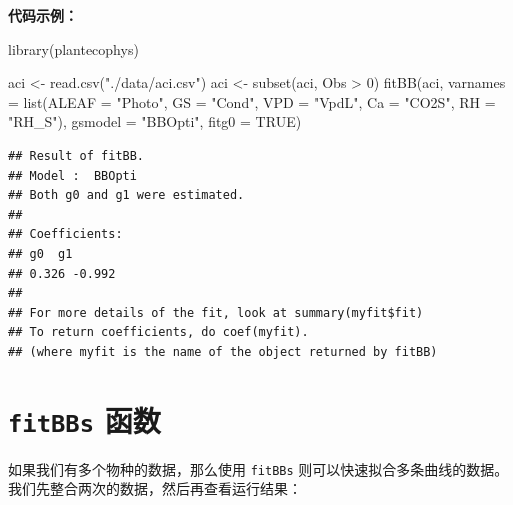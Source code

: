 \documentclass[
]{krantz}
\makeatletter
\newenvironment{Shaded}{\begin{snugshade}}{\end{snugshade}}
\newcommand{\AttributeTok}[1]{\textcolor[rgb]{0.77,0.63,0.00}{#1}}
\newcommand{\ConstantTok}[1]{\textcolor[rgb]{0.00,0.00,0.00}{#1}}
\newcommand{\DecValTok}[1]{\textcolor[rgb]{0.00,0.00,0.81}{#1}}
\newcommand{\FunctionTok}[1]{\textcolor[rgb]{0.00,0.00,0.00}{#1}}
\newcommand{\NormalTok}[1]{#1}
\newcommand{\OtherTok}[1]{\textcolor[rgb]{0.56,0.35,0.01}{#1}}
\newcommand{\SpecialCharTok}[1]{\textcolor[rgb]{0.00,0.00,0.00}{#1}}
\newcommand{\StringTok}[1]{\textcolor[rgb]{0.31,0.60,0.02}{#1}}
\newenvironment{kframe}{%
\medskip{}
\setlength{\fboxsep}{.8em}
 \def\at@end@of@kframe{}%
 \ifinner\ifhmode%
  \def\at@end@of@kframe{\end{minipage}}%
  \begin{minipage}{\columnwidth}%
 \fi\fi%
 \def\FrameCommand##1{\hskip\@totalleftmargin \hskip-\fboxsep
 \colorbox{shadecolor}{##1}\hskip-\fboxsep
     \hskip-\linewidth \hskip-\@totalleftmargin \hskip\columnwidth}%
 \MakeFramed {\advance\hsize-\width
   \@totalleftmargin\z@ \linewidth\hsize
   \@setminipage}}%
 {\par\unskip\endMakeFramed%
 \at@end@of@kframe}
\renewenvironment{Shaded}{\begin{kframe}}{\end{kframe}}
\makeatother
\begin{document}
\textbf{代码示例：}

\begin{Shaded}
\begin{Highlighting}[]
\FunctionTok{library}\NormalTok{(plantecophys)}

\NormalTok{aci }\OtherTok{\textless{}{-}} \FunctionTok{read.csv}\NormalTok{(}\StringTok{"./data/aci.csv"}\NormalTok{)}
\NormalTok{aci }\OtherTok{\textless{}{-}} \FunctionTok{subset}\NormalTok{(aci, Obs }\SpecialCharTok{\textgreater{}} \DecValTok{0}\NormalTok{)}
\FunctionTok{fitBB}\NormalTok{(aci, }\AttributeTok{varnames =} \FunctionTok{list}\NormalTok{(}\AttributeTok{ALEAF =} \StringTok{"Photo"}\NormalTok{, }\AttributeTok{GS =} \StringTok{"Cond"}\NormalTok{, }\AttributeTok{VPD =} \StringTok{"VpdL"}\NormalTok{,}
  \AttributeTok{Ca =} \StringTok{"CO2S"}\NormalTok{, }\AttributeTok{RH =} \StringTok{"RH\_S"}\NormalTok{), }\AttributeTok{gsmodel =} \StringTok{"BBOpti"}\NormalTok{, }\AttributeTok{fitg0 =} \ConstantTok{TRUE}\NormalTok{)}
\end{Highlighting}
\end{Shaded}

\begin{verbatim}
## Result of fitBB.
## Model :  BBOpti 
## Both g0 and g1 were estimated.
## 
## Coefficients:
## g0  g1
## 0.326 -0.992 
## 
## For more details of the fit, look at summary(myfit$fit)
## To return coefficients, do coef(myfit).
## (where myfit is the name of the object returned by fitBB)
\end{verbatim}

\hypertarget{fitbbs}{%
\section{\texorpdfstring{\texttt{fitBBs} 函数}{fitBBs 函数}}\label{fitbbs}}

如果我们有多个物种的数据，那么使用 \texttt{fitBBs} 则可以快速拟合多条曲线的数据。我们先整合两次的数据，然后再查看运行结果：
\end{document}
